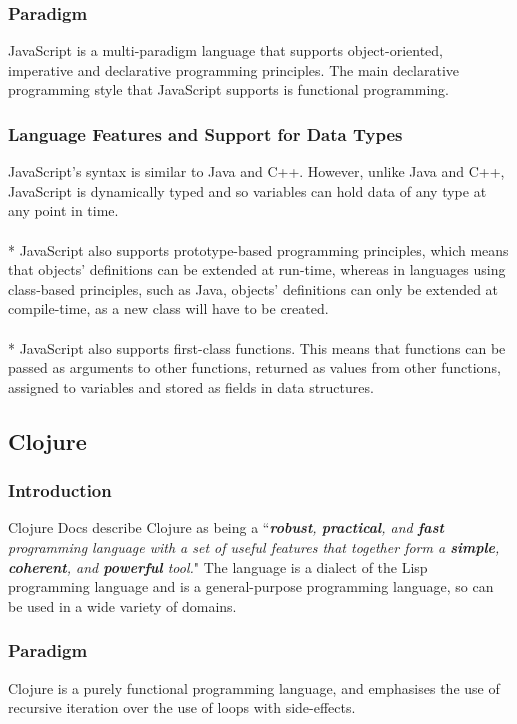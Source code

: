 \subsubsection*{Paradigm}
JavaScript is a multi-paradigm language that supports object-oriented, imperative and declarative programming principles. The main declarative programming style that JavaScript supports is functional programming.
\subsubsection*{Language Features and Support for Data Types}
JavaScript's syntax is similar to Java and C++. However, unlike Java and C++, JavaScript is dynamically typed and so variables can hold data of any type at any point in time.\\\\*
JavaScript also supports prototype-based programming principles, which means that objects' definitions can be extended at run-time, whereas in languages using class-based principles, such as Java, objects' definitions can only be extended at compile-time, as a new class will have to be created.\\\\*
JavaScript also supports first-class functions. This means that functions can be passed as arguments to other functions, returned as values from other functions, assigned to variables and stored as fields in data structures.
\subsection*{Clojure}
\subsubsection*{Introduction}
Clojure Docs describe Clojure as being a ``\textit{\textbf{robust}, \textbf{practical}, and \textbf{fast} programming language with a set of useful features that together form a \textbf{simple}, \textbf{coherent}, and \textbf{powerful} tool.}" The language is a dialect of the Lisp programming language and is a general-purpose programming language, so can be used in a wide variety of domains.
\subsubsection*{Paradigm}
Clojure is a purely functional programming language, and emphasises the use of recursive iteration over the use of loops with side-effects.
